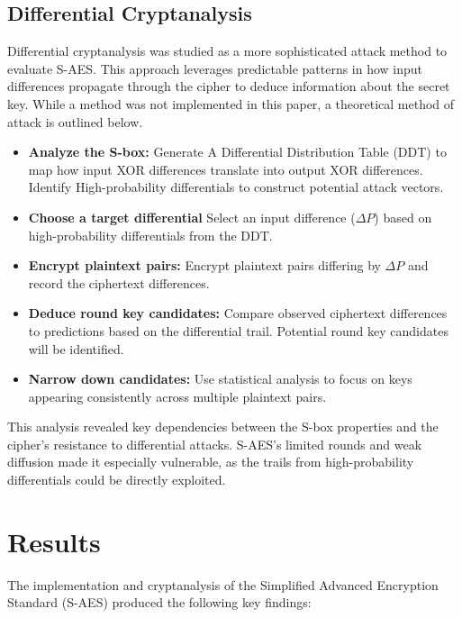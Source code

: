 \documentclass{article}
\begin{document}
\subsection{Differential Cryptanalysis}
Differential cryptanalysis was studied as a more sophisticated attack method to evaluate S-AES. This approach leverages predictable patterns in how input differences propagate through the cipher to deduce information about the secret key. While a method was not implemented in this paper, a theoretical method of attack is outlined below. 
\begin{itemize}
    \item \textbf{Analyze the S-box:} Generate A Differential Distribution Table (DDT) to map how input XOR differences translate into output XOR differences. Identify High-probability differentials to construct potential attack vectors.
    
    \item \textbf{Choose a target differential} Select an input difference (\(\Delta P\)) based on high-probability differentials from the DDT.

    \item \textbf{Encrypt plaintext pairs:} Encrypt plaintext pairs differing by \(\Delta P\) and record the ciphertext differences.

    \item \textbf{Deduce round key candidates:} Compare observed ciphertext differences to predictions based on the differential trail. Potential round key candidates will be identified.

    \item \textbf{Narrow down candidates:} Use statistical analysis to focus on keys appearing consistently across multiple plaintext pairs.
\end{itemize}

This analysis revealed key dependencies between the S-box properties and the cipher’s resistance to differential attacks. S-AES's limited rounds and weak diffusion made it especially vulnerable, as the trails from high-probability differentials could be directly exploited.
\newpage


\section{Results}
The implementation and cryptanalysis of the Simplified Advanced Encryption Standard (S-AES) produced the following key findings:
\end{document}

